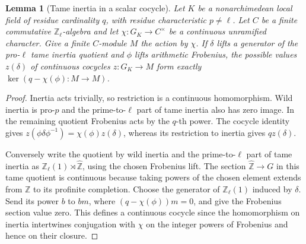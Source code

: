 \documentclass[a4paper,11pt]{article}
\newtheorem{lemma}[proposition]{Lemma}
\theoremstyle{definition}
\theoremstyle{remark}
\newcommand{\ZZ}{\mathbb Z}\newcommand{\ord}{\operatorname{ord}}
\numberwithin{equation}{section}
\begin{document}
\begin{lemma}[Tame inertia in a scalar cocycle]\leavevmode
\label{lem:scalartame725}
Let \(K\) be a nonarchimedean local field of residue cardinality
\(q\), with residue characteristic \(p\ne\ell\). Let \(C\) be a
finite commutative \(\ZZ_\ell\)-algebra and let \(\chi:G_K\to C^\times\)
be a continuous unramified character. Give a finite \(C\)-module
\(M\) the action by \(\chi\). If \(\delta\) lifts a generator of the
pro-\(\ell\) tame inertia quotient and \(\phi\) lifts arithmetic
Frobenius, the possible values \(z(\delta)\) of continuous cocycles
\(z:G_K\to M\) form exactly \(\ker(q-\chi(\phi):M\to M)\).
\end{lemma}
\begin{proof}
Inertia acts trivially, so restriction is a continuous homomorphism.
Wild inertia is pro-\(p\) and the prime-to-\(\ell\) part of tame inertia
also has zero image. In the remaining quotient Frobenius acts by the
\(q\)-th power. The cocycle identity gives
\(z(\phi\delta\phi^{-1})=\chi(\phi)z(\delta)\), whereas its restriction
to inertia gives \(qz(\delta)\).

Conversely write the quotient by wild inertia and the prime-to-\(\ell\)
part of tame inertia as \(\ZZ_\ell(1)\rtimes\widehat{\ZZ}\), using the
chosen Frobenius lift. The section \(\widehat{\ZZ}\to G\) in this tame
quotient is continuous because taking powers of the chosen element
extends from \(\ZZ\) to its profinite completion. Choose the generator
of \(\ZZ_\ell(1)\) induced by \(\delta\). Send its power \(b\) to \(b m\),
where \((q-\chi(\phi))m=0\), and give the Frobenius section value zero.
This defines a continuous cocycle since the homomorphism on inertia
intertwines conjugation with \(\chi\) on the integer powers of Frobenius
and hence on their closure.
\end{proof}
\end{document}
